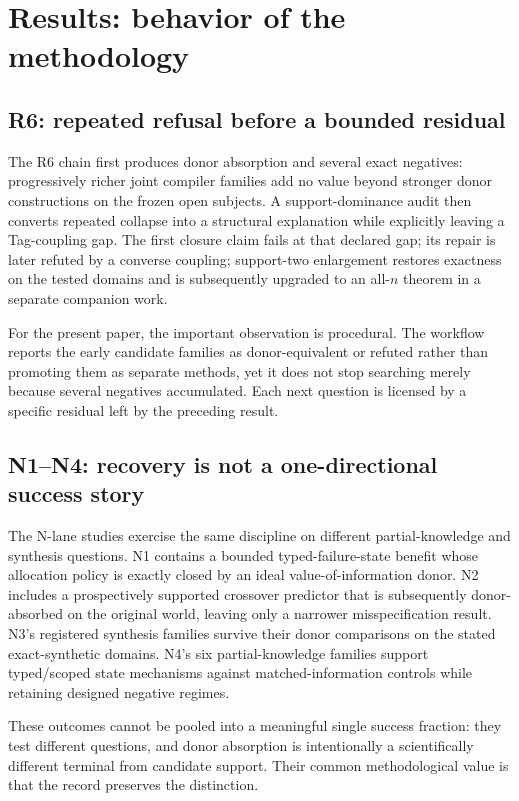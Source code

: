 \section{Results: behavior of the methodology}

\subsection{R6: repeated refusal before a bounded residual}
The R6 chain first produces donor absorption and several exact negatives: progressively richer joint compiler families add no value beyond stronger donor constructions on the frozen open subjects. A support-dominance audit then converts repeated collapse into a structural explanation while explicitly leaving a Tag-coupling gap. The first closure claim fails at that declared gap; its repair is later refuted by a converse coupling; support-two enlargement restores exactness on the tested domains and is subsequently upgraded to an all-$n$ theorem in a separate companion work.

For the present paper, the important observation is procedural. The workflow reports the early candidate families as donor-equivalent or refuted rather than promoting them as separate methods, yet it does not stop searching merely because several negatives accumulated. Each next question is licensed by a specific residual left by the preceding result.

\subsection{N1--N4: recovery is not a one-directional success story}
The N-lane studies exercise the same discipline on different partial-knowledge and synthesis questions. N1 contains a bounded typed-failure-state benefit whose allocation policy is exactly closed by an ideal value-of-information donor. N2 includes a prospectively supported crossover predictor that is subsequently donor-absorbed on the original world, leaving only a narrower misspecification result. N3's registered synthesis families survive their donor comparisons on the stated exact-synthetic domains. N4's six partial-knowledge families support typed/scoped state mechanisms against matched-information controls while retaining designed negative regimes.

These outcomes cannot be pooled into a meaningful single success fraction: they test different questions, and donor absorption is intentionally a scientifically different terminal from candidate support. Their common methodological value is that the record preserves the distinction.

